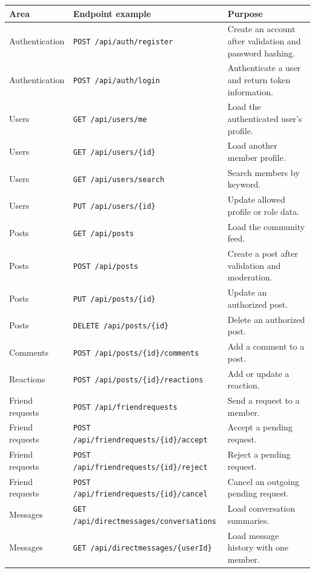 \begin{longtable}{|m{3.2cm}|m{4.5cm}|m{5.8cm}|}
\hline
\textbf{Area} & \textbf{Endpoint example} & \textbf{Purpose} \\
\hline
Authentication & \texttt{POST /api/auth/register} & Create an account after validation and password hashing. \\
\hline
Authentication & \texttt{POST /api/auth/login} & Authenticate a user and return token information. \\
\hline
Users & \texttt{GET /api/users/me} & Load the authenticated user's profile. \\
\hline
Users & \texttt{GET /api/users/\{id\}} & Load another member profile. \\
\hline
Users & \texttt{GET /api/users/search} & Search members by keyword. \\
\hline
Users & \texttt{PUT /api/users/\{id\}} & Update allowed profile or role data. \\
\hline
Posts & \texttt{GET /api/posts} & Load the community feed. \\
\hline
Posts & \texttt{POST /api/posts} & Create a post after validation and moderation. \\
\hline
Posts & \texttt{PUT /api/posts/\{id\}} & Update an authorized post. \\
\hline
Posts & \texttt{DELETE /api/posts/\{id\}} & Delete an authorized post. \\
\hline
Comments & \texttt{POST /api/posts/\{id\}/comments} & Add a comment to a post. \\
\hline
Reactions & \texttt{POST /api/posts/\{id\}/reactions} & Add or update a reaction. \\
\hline
Friend requests & \texttt{POST /api/friendrequests} & Send a request to a member. \\
\hline
Friend requests & \texttt{POST /api/friendrequests/\{id\}/accept} & Accept a pending request. \\
\hline
Friend requests & \texttt{POST /api/friendrequests/\{id\}/reject} & Reject a pending request. \\
\hline
Friend requests & \texttt{POST /api/friendrequests/\{id\}/cancel} & Cancel an outgoing pending request. \\
\hline
Messages & \texttt{GET /api/directmessages/conversations} & Load conversation summaries. \\
\hline
Messages & \texttt{GET /api/directmessages/\{userId\}} & Load message history with one member. \\
\hline

\end{longtable}
